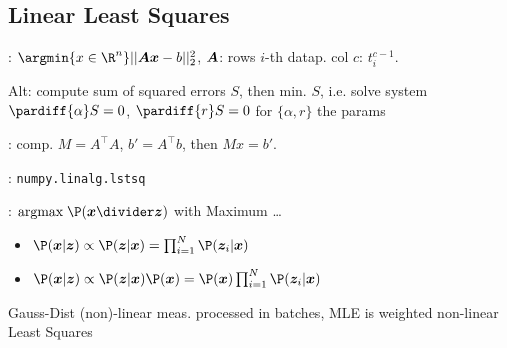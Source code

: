 \subsection{Linear Least Squares}
: $\argmin{x \in \R^n} ||\mat{A}\vec{x} - b||^2_2$, $\bm{A}$: rows $i$-th datap. col $c$: $t_i^{c - 1}$.

Alt: compute sum of squared errors $S$, then min. $S$, i.e. solve system $\pardiff{\alpha}S = 0$, $\pardiff{r} S = 0$ for $\{ \alpha, r \}$ the params

: comp. $M = A^\top A$, $b' = A^\top b$, then $Mx = b'$.

: \texttt{numpy.linalg.lstsq}

: $\text{argmax} \; \P(\vec{x} \divider \vec{z})$ with Maximum \dots
\begin{itemize}
    \item {} $\P(\vec{x} | \vec{z}) \propto \P(\vec{z} | \vec{x}) = \prod_{i = 1}^N \P(\vec{z}_i | \vec{x})$
    \item {} $\P(\vec{x} | \vec{z}) \propto \P(\vec{z} | \vec{x}) \P(\vec{x}) = \P(\vec{x}) \prod_{i = 1}^N \P(\vec{z}_i | \vec{x})$
\end{itemize}
{\scriptsize Gauss-Dist (non)-linear meas. processed in batches, MLE is weighted non-linear Least Squares}
